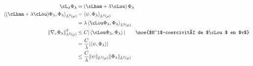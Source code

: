 \begin{equation}
    \label{05:eq:control_v_grad}
    \begin{aligned}
    \cL_\lambda \Phi_\lambda &= \left(\cLham + \lambda\cLou\right)\Phi_\lambda\\
    \left\langle (\cLham+\lambda\cLou)\Phi_\lambda,\Phi_\lambda\right\rangle_{L^2(\mu)} &= \left\langle \psi,\Phi_\lambda\right\rangle_{L^2(\mu)}\\
    &=\lambda\left\langle \cLou \Phi_\lambda,\Phi_\lambda\right\rangle_{L^2(\mu)}\\
    \left\|\nabla_v\Phi_\lambda\right\|^2_{L^2(\mu)} &\leq C|\left\langle \cLou \Phi_\lambda,\Phi_\lambda\right\rangle|\qquad \text{\noe{$H^1$-coercivité de $\cLou$ en $v$}}\\
    &= \frac{C}{\lambda}|\langle \psi,\Phi_\lambda\rangle|\\
    &\leq \frac{C}{\lambda}\|\psi\|_{L^2(\mu)}\|\Phi_\lambda\|_{L^2(\mu)}
    \end{aligned}
\end{equation}

